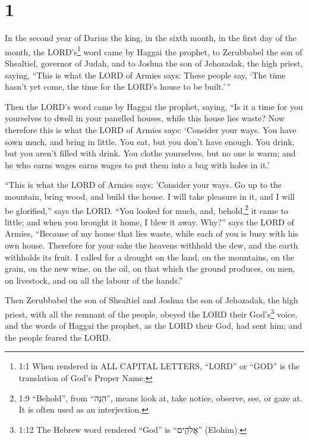 \hypertarget{section}{%
\section{1}\label{section}}

 In the second year of Darius the king, in the sixth month,
in the first day of the month, the LORD's\footnote{1:1 When rendered in
  ALL CAPITAL LETTERS, ``LORD'' or ``GOD'' is the translation of God's
  Proper Name.} word came by Haggai the prophet, to Zerubbabel the son
of Shealtiel, governor of Judah, and to Joshua the son of Jehozadak, the
high priest, saying,  ``This is what the LORD of Armies
says: These people say, `The time hasn't yet come, the time for the
LORD's house to be built.'\,''

 Then the LORD's word came by Haggai the prophet, saying,
 ``Is it a time for you yourselves to dwell in your panelled
houses, while this house lies waste?  Now therefore this is
what the LORD of Armies says: `Consider your ways.  You have
sown much, and bring in little. You eat, but you don't have enough. You
drink, but you aren't filled with drink. You clothe yourselves, but no
one is warm; and he who earns wages earns wages to put them into a bag
with holes in it.'

 ``This is what the LORD of Armies says: 'Consider your
ways.  Go up to the mountain, bring wood, and build the
house. I will take pleasure in it, and I will be glorified,'' says the
LORD.  ``You looked for much, and, behold,\footnote{1:9
  ``Behold'', from ``הִנֵּה'', means look at, take notice, observe, see,
  or gaze at. It is often used as an interjection.} it came to little;
and when you brought it home, I blew it away. Why?'' says the LORD of
Armies, ``Because of my house that lies waste, while each of you is busy
with his own house.  Therefore for your sake the heavens
withhold the dew, and the earth withholds its fruit.  I
called for a drought on the land, on the mountains, on the grain, on the
new wine, on the oil, on that which the ground produces, on men, on
livestock, and on all the labour of the hands.''

 Then Zerubbabel the son of Shealtiel and Joshua the son of
Jehozadak, the high priest, with all the remnant of the people, obeyed
the LORD their God's\footnote{1:12 The Hebrew word rendered ``God'' is
  ``אֱלֹהִ֑ים'' (Elohim).} voice, and the words of Haggai the prophet,
as the LORD their God, had sent him; and the people feared the LORD.

